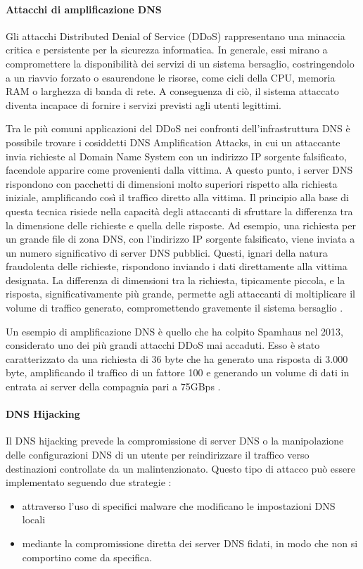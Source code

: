 \paragraph{Attacchi di amplificazione DNS}
Gli attacchi Distributed Denial of Service (DDoS) rappresentano una minaccia critica e persistente per la sicurezza informatica. In generale, essi mirano a compromettere la disponibilità dei servizi di un sistema bersaglio, costringendolo a un riavvio forzato o esaurendone le risorse, come cicli della CPU, memoria RAM o larghezza di banda di rete. A conseguenza di ciò, il sistema attaccato diventa incapace di fornire i servizi previsti agli utenti legittimi.

Tra le più comuni applicazioni del DDoS nei confronti dell'infrastruttura DNS è possibile trovare i cosiddetti DNS Amplification Attacks, in cui un attaccante invia richieste al Domain Name System con un indirizzo IP sorgente falsificato, facendole apparire come provenienti dalla vittima. A questo punto, i server DNS rispondono con pacchetti di dimensioni molto superiori rispetto alla richiesta iniziale, amplificando così il traffico diretto alla vittima.
%
Il principio alla base di questa tecnica risiede nella capacità degli attaccanti di sfruttare la differenza tra la dimensione delle richieste e quella delle risposte. Ad esempio, una richiesta per un grande file di zona DNS, con l'indirizzo IP sorgente falsificato, viene inviata a un numero significativo di server DNS pubblici. Questi, ignari della natura fraudolenta delle richieste, rispondono inviando i dati direttamente alla vittima designata. La differenza di dimensioni tra la richiesta, tipicamente piccola, e la risposta, significativamente più grande, permette agli attaccanti di moltiplicare il volume di traffico generato, compromettendo gravemente il sistema bersaglio \cite{Alieyan2016}.

Un esempio di amplificazione DNS è quello che ha colpito Spamhaus nel 2013, considerato uno dei più grandi attacchi DDoS mai accaduti. Esso è stato caratterizzato da una richiesta di 36 byte che ha generato una risposta di 3.000 byte, amplificando il traffico di un fattore 100 e generando un volume di dati in entrata ai server della compagnia pari a 75GBps \cite{Bonasera2021}.

\paragraph{DNS Hijacking}
Il DNS hijacking prevede la compromissione di server DNS o la manipolazione delle configurazioni DNS di un utente per reindirizzare il traffico verso destinazioni controllate da un malintenzionato. Questo tipo di attacco può essere implementato seguendo due strategie \cite{hudaib2014dns}:
\begin{itemize}
  \item attraverso l'uso di specifici malware che modificano le impostazioni DNS locali
  \item mediante la compromissione diretta dei server DNS fidati, in modo che non si comportino come da specifica.
\end{itemize}

